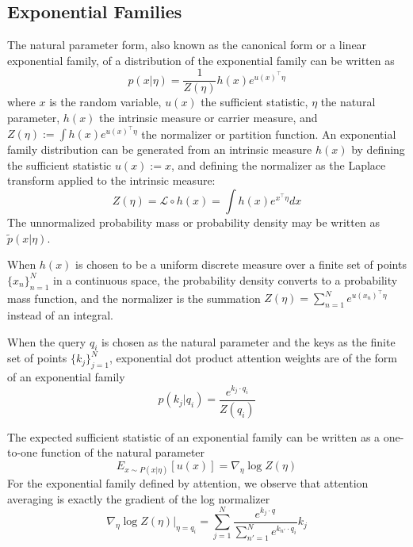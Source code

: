 \documentclass{article}
\begin{document}
\subsection{Exponential Families}
\label{exponential families}
The natural parameter form, also known as the canonical form or a linear exponential family, of a distribution of the exponential family can be written as
\begin{equation}
  p(x \vert \eta) = 
    \frac{1}{Z \left( \eta \right) }
    h(x)
    e^{ u(x)^\intercal \eta}
  \label{exponential family}
\end{equation}
where $x$ is the random variable, 
$u(x)$ the sufficient statistic, 
$\eta$ the natural parameter, 
$h(x)$ the intrinsic measure or carrier measure, 
and 
$Z ( \eta ) := \int h(x) e^{ u(x)^\intercal \eta }$ the normalizer or partition function.
An exponential family distribution can be generated from an intrinsic measure $h(x)$ by defining the sufficient statistic $u(x) := x$, and defining the normalizer as the Laplace transform applied to the intrinsic measure:
\begin{equation}
  Z ( \eta ) = \mathcal{L} \circ h(x) = \int h(x) e^{ x^\intercal \eta} dx
  \label{Laplace transform}
\end{equation}
The unnormalized probability mass or probability density may be written as $\tilde{p}(x \vert \eta)$.

When $h(x)$ is chosen to be a uniform discrete measure over a finite set of points 
$\{x_n\}_{n=1}^N $
in a continuous space, the probability density converts to a probability mass function, and the normalizer is the summation 
$Z( \eta ) = \sum_{n=1}^N e^{ u(x_n)^\intercal \eta} $
instead of an integral.

When the query $q_i$ is chosen as the natural parameter and the keys as the finite set of points $\{ k_j \}_{j=1}^N$, exponential dot product attention weights are of the form of an exponential family
\begin{equation}
  p( k_j \vert q_i ) = 
  \frac
    { e^{k_j \cdot q_i } }
    { Z(q_i) }
  \label{exponential family attention}
\end{equation}

The expected sufficient statistic of an exponential family can be written as a one-to-one function of the natural parameter
\begin{equation}
  E_{ x \sim P( x \vert \eta) } \left[ u(x) \right] =
  \nabla_\eta \log Z(\eta)
  \label{activation function}
\end{equation}
For the exponential family defined by attention, we observe that attention averaging is exactly the gradient of the log normalizer
\begin{equation}
  \nabla_\eta \log Z(\eta) \vert_{\eta = q_i} = 
  \sum_{j=1}^N 
    \frac
      { e^{ k_j \cdot q } }
      { \sum_{n'=1}^N e^{k_{n'} \cdot q_i} }
    k_j
  \label{attention gradient update}
\end{equation}
\end{document}
